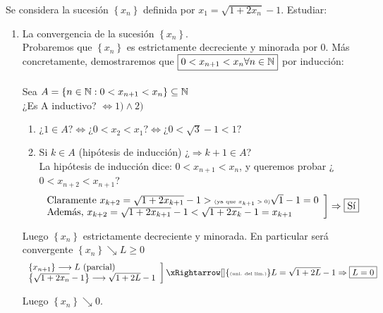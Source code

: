 \documentclass[12pt]{article}
\begin{document}
	\newpage
	
		\begin{ejercicio}[2 puntos] Se considera la sucesión $\left\{x_n\right\}$ definida por $x_1 = \sqrt{1+2x_n} -1$. Estudiar:
		\begin{enumerate}
			\item La convergencia de la sucesión $\left\{x_n\right\}$. \\
			Probaremos que $\left\{x_n\right\}$ es estrictamente decreciente y minorada por 0. Más concretamente, demostraremos que $\boxed{0<x_{n+1}<x_n \forall n \in {\mathbb{N}}}$ por inducción: \\
			\\
			Sea $A= \left\{n \in {\mathbb{N}} : 0<x_{n+1}<x_n \right\} \subseteq {\mathbb{N}}$ \\
			¿Es A inductivo? $\Leftrightarrow 1) \land 2)$
			\begin{enumerate}[label=\arabic*)]
				\item $\text{¿} 1\in A? \Leftrightarrow \text{¿}0<x_2<x_1? \Leftrightarrow \text{¿}0< \sqrt{3} -1 < 1?$ 
				\item Si $k \in A$ {\tiny (hipótesis de inducción)} ¿$\Rightarrow k+1 \in A$? \\
				La hipótesis de inducción dice: $0<x_{n+1}<x_n$, y queremos probar ¿$0<x_{n+2}<x_{n+1}$?
				\[
				\left.
				\begin{array}{l}
				\text{Claramente } x_{k+2}= \sqrt{1+2x_{k+1}}-1 > \text{{\tiny (ya que $x_{k+1}>0$)}}\sqrt{1} - 1 = 0 \\
				\text{Además, } x_{k+2} = \sqrt{1+2x_{k+1}} -1 < \sqrt{1+2x_k} -1 = x_{k+1}				
				\end{array}
				\right]
				\Rightarrow \text{\fbox{Sí}}
				\]
			\end{enumerate}
			
			Luego $\left\{x_n\right\}$ estrictamente decreciente y minorada. En particular será convergente $\left\{x_n\right\} \searrow L \geq 0$ 
			\[
			\left.
			\begin{array}{l}
			\left\{x_{n+1}\right\} \longrightarrow L \text{ (parcial)} \\
			\left\{ \sqrt{1+2x_n} -1 \right\} \longrightarrow \sqrt{1+2L} -1
			\end{array}
			\right]
			\xRightarrow[]{\text{{\tiny (uni. del lím.)}}} L = \sqrt{1+2L} -1 \Rightarrow \boxed{L=0}
			\]
				
			Luego $\left\{x_n\right\} \searrow 0$.
		

\end{enumerate}
\end{ejercicio}
\end{document}
